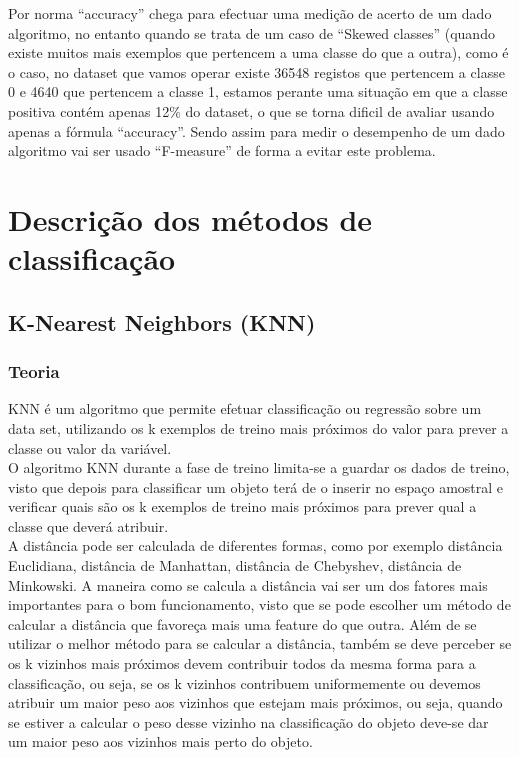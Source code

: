 \documentclass[portugues,final]{revdetua}
\begin{document}
Por norma “accuracy” chega para efectuar uma medição de acerto de um dado algoritmo, no entanto quando se trata de um caso de “Skewed classes” (quando existe muitos mais exemplos que pertencem a uma classe do que a outra), como é o caso, no dataset que vamos operar existe 36548 registos que pertencem a classe 0 e 4640 que pertencem a classe 1, estamos perante uma situação em que a classe positiva contém apenas 12\% do dataset, o que se torna dificil de avaliar usando apenas a fórmula “accuracy”.
Sendo assim para medir o desempenho de um dado algoritmo vai ser usado “F-measure” de forma a evitar este problema.

\section{Descrição dos métodos de classificação}

\subsection{K-Nearest Neighbors (KNN)}

\subsubsection{Teoria}

KNN é um algoritmo que permite efetuar classificação ou regressão sobre um data set, utilizando os k exemplos de treino mais próximos do valor para prever a classe ou valor da variável.\\

O algoritmo KNN durante a fase de treino limita-se a guardar os dados de treino, visto que depois para classificar um objeto terá de o inserir no espaço amostral e verificar quais são os k exemplos de treino mais próximos para prever qual a classe que deverá atribuir.\\

A distância pode ser calculada de diferentes formas, como por exemplo distância Euclidiana, distância de Manhattan, distância de Chebyshev, distância de Minkowski. A maneira como se calcula a distância vai ser um dos fatores mais importantes para o bom funcionamento, visto que se pode escolher um método de calcular a distância que favoreça mais uma feature do que outra. Além de se utilizar o melhor método para se calcular a distância, também se deve perceber se os k vizinhos mais próximos devem contribuir todos da mesma forma para a classificação, ou seja, se os k vizinhos contribuem uniformemente ou devemos atribuir um maior peso aos vizinhos que estejam mais próximos, ou seja, quando se estiver a calcular o peso desse vizinho na classificação do objeto deve-se dar um maior peso aos vizinhos mais perto do objeto.\\
\end{document}
